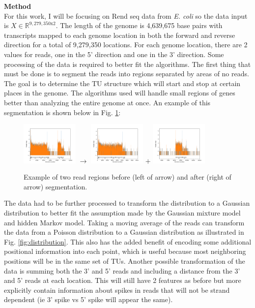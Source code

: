 \documentclass[11pt]{article}
\begin{document}
\textbf{Method} \vspace{4pt} \\
For this work, I will be focusing on Rend seq data from \textit{E. coli} so the data input is $X\in \mathbb{R}^{9,279,350\text{x}2}$. The length of the genome is 4,639,675 base pairs with transcripts mapped to each genome location in both the forward and reverse direction for a total of 9,279,350 locations.  For each genome location, there are 2 values for reads, one in the 5' direction and one in the 3' direction.  Some processing of the data is required to better fit the algorithms.  The first thing that must be done is to segment the reads into regions separated by areas of no reads.  The goal is to determine the TU structure which will start and stop at certain places in the genome.  The algorithms used will handle small regions of genes better than analyzing the entire genome at once.  An example of this segmentation is shown below in Fig. \ref{fig:segmentation}:

\begin{figure}[H]
    \centering
    \includegraphics[align=c, width=0.25\textwidth]{both.png} $\boldsymbol{\longrightarrow}$
    \includegraphics[align=c, width=0.25\textwidth]{0.png} $\boldsymbol{+}$
    \includegraphics[align=c, width=0.25\textwidth]{1.png}
    \caption{Example of two read regions before (left of arrow) and after (right of arrow) segmentation.}
    \label{fig:segmentation}
\end{figure}

The data had to be further processed to transform the distribution to a Gaussian distribution to better fit the assumption made by the Gaussian mixture model and hidden Markov model.  Taking a moving average of the reads can transform the data from a Poisson distribution to a Gaussian distribution as illustrated in Fig. \ref{fig:distribution}.  This also has the added benefit of encoding some additional positional information into each point, which is useful because most neighboring positions will be in the same set of TUs.  Another possible transformation of the data is summing both the 3' and 5' reads and including a distance from the 3' and 5' reads at each location.  This will still have 2 features as before but more explicitly contain information about spikes in reads that will not be strand dependent (ie 3' spike vs 5' spike will appear the same).
\end{document}
